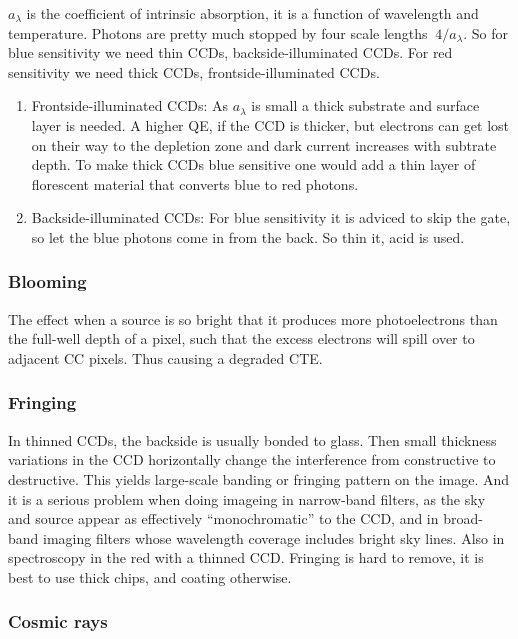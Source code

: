 \documentclass[a4paper]{article}
\begin{document}
$a_\lambda$ is the coefficient of intrinsic absorption, it is a function of wavelength and temperature. Photons are pretty much stopped by four scale lengths $~4/a_\lambda$. So for blue sensitivity we need thin CCDs, backside-illuminated CCDs. For red sensitivity we need thick CCDs, frontside-illuminated CCDs.

\begin{enumerate}
    \item Frontside-illuminated CCDs: As $a_\lambda$ is small a thick substrate and surface layer is needed. A higher QE, if the CCD is thicker, but electrons can get lost on their way to the depletion zone and dark current increases with subtrate depth. To make thick CCDs blue sensitive one would add a thin layer of florescent material that converts blue to red photons.
    \item Backside-illuminated CCDs: For blue sensitivity it is adviced to skip the gate, so let the blue photons come in from the back. So thin it, acid is used.
\end{enumerate}

\subsubsection*{Blooming}

The effect when a source is so bright that it produces more photoelectrons than the full-well depth of a pixel, such that the excess electrons will spill over to adjacent CC pixels. Thus causing a degraded CTE. 

\subsubsection*{Fringing}

In thinned CCDs, the backside is usually bonded to glass. Then small thickness variations in the CCD horizontally change the interference from constructive to destructive. This yields large-scale banding or fringing pattern on the image. And it is a serious problem when doing imageing in narrow-band filters, as the sky and source appear as effectively ``monochromatic'' to the CCD, and in broad-band imaging filters whose wavelength coverage includes bright sky lines. Also in spectroscopy in the red with a thinned CCD. Fringing is hard to remove, it is best to use thick chips, and coating otherwise.

\subsubsection{Cosmic rays}
\end{document}
